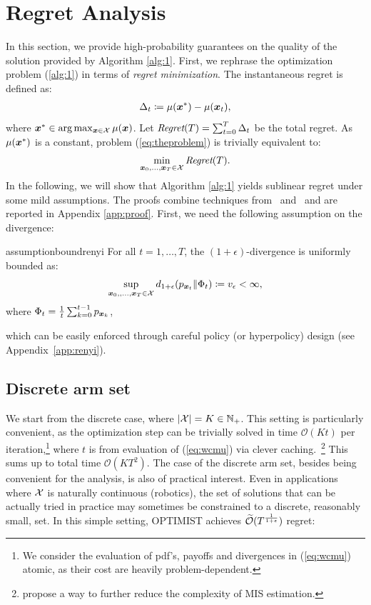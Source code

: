 \documentclass{article}
\makeatletter
\DeclareRobustCommand{\algoname}{OPTIMIST\@\xspace}
\makeatother
\begin{document}
\section{Regret Analysis}\label{sec:regret}
In this section, we provide high-probability guarantees on the quality of the solution provided by Algorithm \ref{alg:1}.
First, we rephrase the optimization problem (\ref{alg:1}) in terms of \textit{regret minimization}. The instantaneous regret is defined as:
\begin{align}\label{eq:inregret}
	\Delta_t \coloneqq \mu(\boldsymbol{x}^*) - \mu(\boldsymbol{x}_t),
\end{align}
where $\boldsymbol{x}^* \in \arg\max_{\boldsymbol{x}\in\mathcal{X}}\mu(\boldsymbol{x})$. Let $\textit{Regret}(T) = \sum_{t=0}^T\Delta_t$ be the total regret.
As $\mu(\boldsymbol{x}^*)$ is a constant, problem (\ref{eq:theproblem}) is trivially equivalent to:
\begin{align}\label{eq:regret}
	\min_{\boldsymbol{x}_0,\dots,\boldsymbol{x}_T\in\mathcal{X}} \textit{Regret}(T).
\end{align}
In the following, we will show that Algorithm \ref{alg:1} yields sublinear regret under some mild assumptions. The proofs combine techniques from~\citet{srinivas2010gaussian} and~\citet{bubeck2013bandits} and are reported in Appendix \ref{app:proof}.
First, we need the following assumption on the \Renyi divergence:
%
\begin{restatable}{assumption}{boundrenyi}\label{ass:boundrenyi}
	For all $t=1,\dots,T$, the $(1+\epsilon)$-\Renyi divergence is uniformly bounded as:
	\begin{align*}
		\sup_{\boldsymbol{x}_0,,\dots,\boldsymbol{x}_T\in\mathcal{X}}d_{1+\epsilon}(p_{\boldsymbol{x}_t}\|\Phi_t) \coloneqq v_{\epsilon} < \infty,
	\end{align*}
	where $\Phi_t = \frac{1}{t}\sum_{k=0}^{t-1}p_{\boldsymbol{x}_k}$,
\end{restatable}
%
which can be easily enforced through careful policy (or hyperpolicy) design (see Appendix~\ref{app:renyi}).

\subsection{Discrete arm set}
We start from the discrete case, where $|\mathcal{X}| = K \in \mathbb{N}_{+}$.
This setting is particularly convenient, as the optimization step can be trivially solved in time $\mathcal{O}(Kt)$ per iteration,\footnote{We consider the evaluation of pdf's, payoffs and \Renyi divergences in (\ref{eq:wcmu}) atomic, as their cost are heavily problem-dependent.} where $t$ is from evaluation of (\ref{eq:wcmu}) via clever caching.~\footnote{\citet{elvira2015efficient} propose a way to further reduce the complexity of MIS estimation.} This sums up to total time $\mathcal{O}(KT^2)$. The case of the discrete arm set, besides being convenient for the analysis, is also of practical interest. Even in applications where $\mathcal{X}$ is naturally continuous (\eg robotics), the set of solutions that can be actually tried in practice may sometimes be constrained to a discrete, reasonably small, set. In this simple setting, \algoname achieves $\widetilde{\mathcal{O}}(T^{\frac{1}{1+\epsilon}})$ regret:
\end{document}
